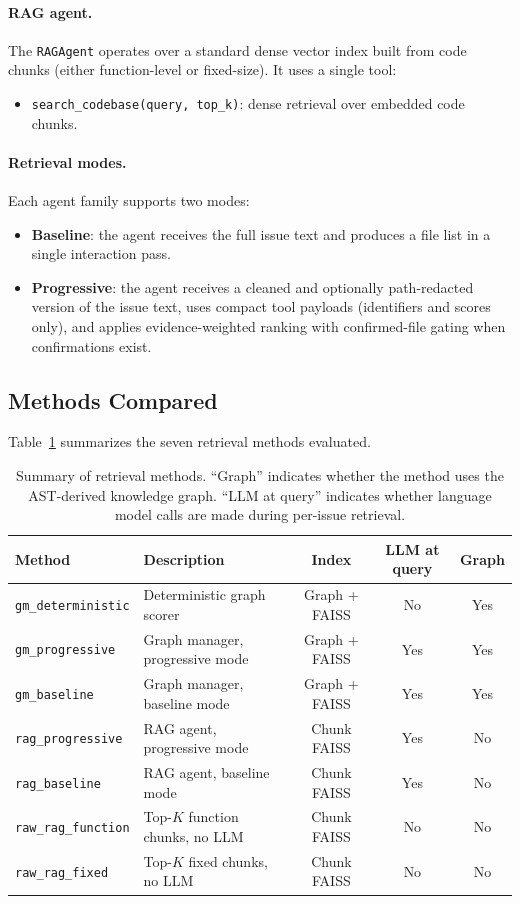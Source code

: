 \paragraph{RAG agent.}
The \texttt{RAGAgent} operates over a standard dense vector index built from code chunks (either function-level or fixed-size). It uses a single tool:
\begin{itemize}[leftmargin=1.5em]
  \item \texttt{search\_codebase(query, top\_k)}: dense retrieval over embedded code chunks.
\end{itemize}

\paragraph{Retrieval modes.}
Each agent family supports two modes:
\begin{itemize}[leftmargin=1.5em]
  \item \textbf{Baseline}: the agent receives the full issue text and produces a file list in a single interaction pass.
  \item \textbf{Progressive}: the agent receives a cleaned and optionally path-redacted version of the issue text, uses compact tool payloads (identifiers and scores only), and applies evidence-weighted ranking with confirmed-file gating when confirmations exist.
\end{itemize}

\subsection{Methods Compared}
\label{sec:methods_compared}

Table~\ref{tab:methods} summarizes the seven retrieval methods evaluated.

\begin{table}[t]
\centering
\small
\begin{tabular}{llccc}
\toprule
Method & Description & Index & LLM at query & Graph \\
\midrule
\texttt{gm\_deterministic} & Deterministic graph scorer & Graph + FAISS & No & Yes \\
\texttt{gm\_progressive} & Graph manager, progressive mode & Graph + FAISS & Yes & Yes \\
\texttt{gm\_baseline} & Graph manager, baseline mode & Graph + FAISS & Yes & Yes \\
\texttt{rag\_progressive} & RAG agent, progressive mode & Chunk FAISS & Yes & No \\
\texttt{rag\_baseline} & RAG agent, baseline mode & Chunk FAISS & Yes & No \\
\texttt{raw\_rag\_function} & Top-$K$ function chunks, no LLM & Chunk FAISS & No & No \\
\texttt{raw\_rag\_fixed} & Top-$K$ fixed chunks, no LLM & Chunk FAISS & No & No \\
\bottomrule
\end{tabular}
\caption{Summary of retrieval methods. ``Graph'' indicates whether the method uses the AST-derived knowledge graph. ``LLM at query'' indicates whether language model calls are made during per-issue retrieval.}
\label{tab:methods}
\end{table}

